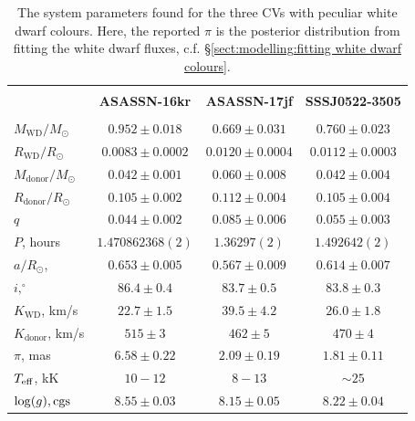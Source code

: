 \begin{landscape}
    \begin{table}
        \centering
        \caption{The system parameters found for the three CVs with peculiar white dwarf colours. Here, the reported $\pi$ is the posterior distribution from fitting the white dwarf fluxes, c.f. \S\ref{sect:modelling:fitting white dwarf colours}.}
        \label{table:three white dwarfs:system_parameters}
        \begin{tabular}{lccc}
            \hline \\
            ~                          & \textbf{ASASSN-16kr}    & \textbf{ASASSN-17jf}  & \textbf{SSSJ0522-3505} \\
            \hline \hline \\
            $M_\mathrm{WD}/M_\odot$    & $0.952\pm0.018$         & $0.669\pm0.031$        & $0.760\pm0.023$ \\
            $R_\mathrm{WD}/R_\odot$    & $0.0083\pm0.0002$       & $0.0120\pm0.0004$      & $0.0112\pm0.0003$ \\
            $M_\mathrm{donor}/M_\odot$ & $0.042\pm0.001$         & $0.060\pm0.008$        & $0.042\pm0.004$ \\
            $R_\mathrm{donor}/R_\odot$ & $0.105\pm0.002$         & $0.112\pm0.004$        & $0.105\pm0.004$ \\
            $q$                        & $0.044\pm0.002$         & $0.085\pm0.006$        & $0.055\pm0.003$ \\
            \hline
            $P$, hours                 & $1.470862368(2)$        & $1.36297(2)$           & $1.492642(2)$ \\
            $a/R_\odot$,               & $0.653\pm0.005$         & $0.567\pm0.009$        & $0.614\pm0.007$  \\
            $i, ^\circ$                & $86.4\pm0.4$            & $83.7\pm0.5$           & $83.8\pm0.3$  \\
            $K_\mathrm{WD}$, km/s      & $22.7\pm1.5$            & $39.5\pm4.2$           & $26.0\pm1.8$  \\
            $K_\mathrm{donor}$, km/s   & $515\pm3$               & $462\pm5$              & $470\pm4$  \\
            \hline
            $\pi$, mas                 & $6.58\pm0.22$           & $2.09\pm0.19$          & $1.81\pm0.11$  \\
            $T_{\rm eff}$, kK          & $10-12$                 & $8-13$                 & $\sim25$  \\
            $\log(g), {\rm cgs}$       & $8.55\pm0.03$           & $8.15\pm0.05$          & $8.22\pm0.04$  \\
            \hline
            \hline
        \end{tabular}
    \end{table}



\end{landscape}
